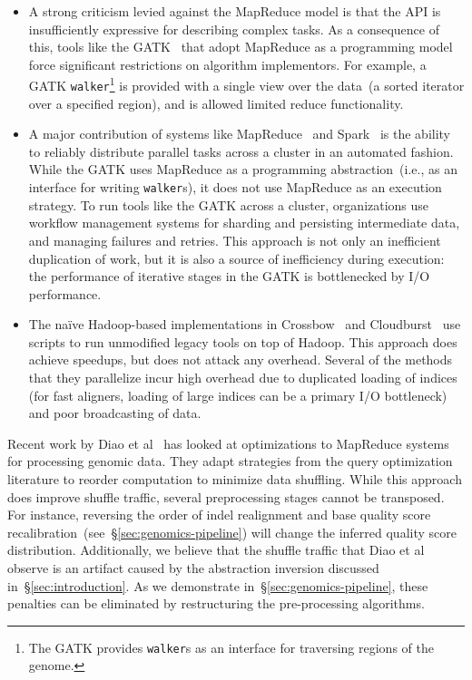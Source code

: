 \documentclass[10pt]{report} %
\begin{document}
\begin{itemize}
\item A strong criticism levied against the MapReduce model is that the API is insufficiently expressive
for describing complex tasks. As a consequence of this, tools like the GATK~\cite{mckenna10} that
adopt MapReduce as a programming model force significant restrictions on algorithm implementors. For
example, a GATK \texttt{walker}\footnote{The GATK provides \texttt{walker}s as an interface for
traversing regions of the genome.} is provided with a single view over the data~(a sorted iterator over a
specified region), and is allowed limited reduce functionality.
\item A major contribution of systems like MapReduce~\cite{dean08} and Spark~\cite{zaharia10,
zaharia12} is the ability to reliably distribute parallel tasks across a cluster in an automated fashion. While
the GATK uses MapReduce as a programming abstraction~(i.e., as an interface for writing
\texttt{walker}s), it does not use MapReduce as an execution strategy. To run tools like the GATK across
a cluster, organizations use workflow management systems for sharding and persisting intermediate
data, and managing failures and retries. This approach is not only an inefficient duplication of work, but it is also a
source of inefficiency during execution: the performance of iterative stages in the GATK is bottlenecked
by I/O performance.
\item The na\"{i}ve Hadoop-based implementations in Crossbow~\cite{langmead09} and
Cloudburst~\cite{schatz09} use scripts to run unmodified legacy tools on top of Hadoop. This approach does
achieve speedups, but does not attack any overhead. Several of the methods that they parallelize incur
high overhead due to duplicated loading of indices (for fast aligners, loading of large indices can be a
primary I/O bottleneck) and poor broadcasting of data.
\end{itemize}

Recent work by Diao et al~\cite{diao15} has looked at optimizations to MapReduce systems for
processing genomic data. They adapt strategies from the query optimization literature to reorder
computation to minimize data shuffling. While this approach does improve shuffle traffic, several
preprocessing stages cannot be transposed. For instance, reversing the order of indel realignment and
base quality score recalibration~(see~\S\ref{sec:genomics-pipeline}) will change the inferred quality
score distribution. Additionally, we believe that the shuffle traffic that Diao et al observe is an artifact
caused by the abstraction inversion discussed in~\S\ref{sec:introduction}. As we demonstrate
in~\S\ref{sec:genomics-pipeline}, these penalties can be eliminated by restructuring the pre-processing
algorithms.
\end{document}
